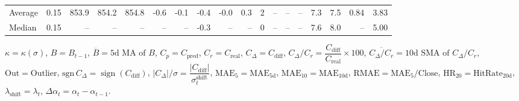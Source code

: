 \begin{threeparttable}
{\begin{tabular}{lrrrrrrrrrrrrrrrrr}
Average &     0.15 & 853.9 & 854.2 & 854.8 &       -0.6 &           -0.1 &                      -0.4 &                     -0.0 &                 0.3 &              2 &         -- &        -- &             -- &              7.3 &                 7.5 &            0.84 &                   3.83 \\
 Median &     0.15 &    -- &    -- &    -- &         -- &             -- &                      -0.3 &                       -- &                  -- &              0 &         -- &        -- &             -- &              7.6 &                 8.0 &              -- &                   5.00 \\
\bottomrule
\end{tabular}
}
\begin{tablenotes}\footnotesize
\item $\kappa=\kappa(\sigma)$, $B=B_{t-1}$, $\overline{B}=\text{5d MA of }B$, $C_p=C_{\text{pred}}$, $C_r=C_{\text{real}}$, $C_\Delta=C_{\text{diff}}$, $C_\Delta/C_r=\dfrac{C_{\text{diff}}}{C_{\text{real}}}\times100$, $\overline{C_\Delta/C_r}=\text{10d SMA of }C_\Delta/C_r$, $\mathrm{Out}=\text{Outlier}$, $\mathrm{sgn}\,C_\Delta=\operatorname{sign}(C_{\text{diff}})$, $|C_\Delta|/\sigma=\dfrac{|C_{\text{diff}}|}{\sigma_t^{\text{shift}}}$, $\mathrm{MAE}_5=\mathrm{MAE}_{5\text{d}}$, $\mathrm{MAE}_{10}=\mathrm{MAE}_{10\text{d}}$, $\mathrm{RMAE}= \mathrm{MAE}_5 / \text{Close}$, $\mathrm{HR}_{20}=\mathrm{HitRate}_{20\text{d}}$, $\lambda_{\text{shift}}=\lambda_t$, $\Delta\alpha_t=\alpha_t-\alpha_{t-1}$.
\end{tablenotes}
\end{threeparttable}
\endgroup

